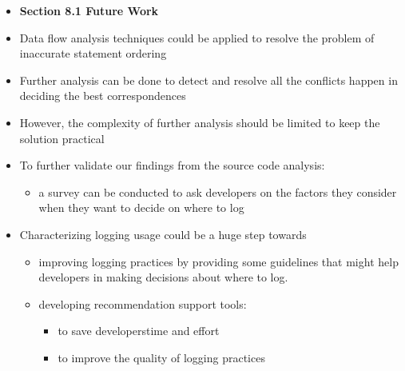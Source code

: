 \documentclass{article}
\newcommand{\bold}{\textbf}
\begin{document}
\begin{itemize} [leftmargin=.1in]
\item \bold{Section 8.1 Future Work}
\item Data flow analysis techniques could be applied to resolve the problem of inaccurate statement ordering
\item Further analysis can be done to detect and resolve all the conflicts happen in deciding the best correspondences
\item However, the complexity of further analysis should be limited to keep the solution practical
\item To further validate our findings from the source code analysis:
\begin{itemize}
\item a survey can be conducted to ask developers on the factors they consider when they want to decide on where to log
\end{itemize}
\item Characterizing logging usage could be a huge step towards
\begin{itemize}
\item improving logging practices by providing some guidelines that might help developers in making decisions about where to
log.
\item developing recommendation support tools:
\begin{itemize}
\item to save developers\textquotesingle time and effort
\item to improve the quality of logging practices
\end{itemize}
\end{itemize}

\end{itemize} %
\end{document}
